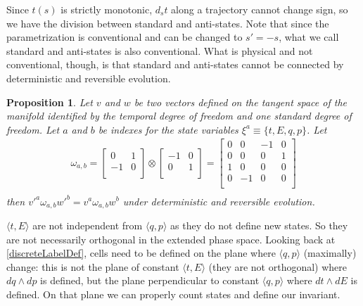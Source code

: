 \documentclass[aps,pra,10pt,twocolumn,floatfix,nofootinbib]{revtex4-1}
\newtheorem{prop}[thm]{Proposition}
\theoremstyle{definition}
\begin{document}
Since $t(s)$ is strictly monotonic, $d_{s}t$ along a trajectory cannot change sign, so we have the division between standard and anti-states. Note that since the parametrization is conventional and can be changed to $s'=-s$, what we call standard and anti-states is also conventional. What is physical and not conventional, though, is that standard and anti-states cannot be connected by deterministic and reversible evolution.

\begin{prop}\label{tdofInvariant}
Let $v$ and $w$ be two vectors defined on the tangent space of the manifold identified by the temporal degree of freedom and one standard degree of freedom. Let $a$ and $b$ be indexes for the state variables $\xi^a\equiv\{t, E, q, p\}$. Let
\begin{align*}
\omega_{a, b} =  \left[
  \begin{array}{cc}
    0 & 1 \\
    -1 & 0 \\
  \end{array}
\right] \otimes \left[
  \begin{array}{cc}
    -1 & 0 \\
    0 & 1 \\
  \end{array}
\right]
= \left[
  \begin{array}{cccc}
    0 & 0 & -1 & 0 \\
    0 & 0 & 0 & 1 \\
    1 & 0 & 0 & 0 \\
    0 & -1 & 0 & 0 \\
  \end{array}
\right] \\
\end{align*}
then $v'^{a} \omega_{a, b} w'^{b}=v^{a} \omega_{a, b} w^{b}$ under deterministic and reversible evolution.
\end{prop}

$\langle t, E \rangle$ are not independent from $\langle q, p \rangle$ as they do not define new states. So they are not necessarily orthogonal in the extended phase space. Looking back at \ref{discreteLabelDef}, cells need to be defined on the plane where $\langle q, p \rangle$ (maximally) change: this is not the plane of constant $\langle t, E \rangle$ (they are not orthogonal) where $dq \wedge dp$ is defined, but the plane perpendicular to constant $\langle q, p \rangle$ where $dt \wedge dE$ is defined. On that plane we can properly count states and define our invariant.
\end{document}
